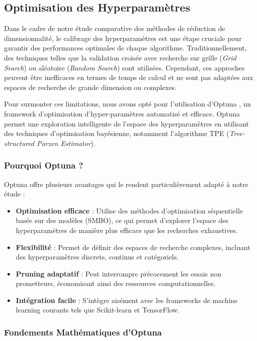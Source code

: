 \documentclass[unnumsec,webpdf,modern,large]{projet_manifold}%
\theoremstyle{thmstyleone}%
\theoremstyle{thmstyletwo}%
\theoremstyle{thmstylethree}%
\begin{document}
\subsection{Optimisation des Hyperparamètres}

Dans le cadre de notre étude comparative des méthodes de réduction de dimensionnalité, le calibrage des hyperparamètres est une étape cruciale pour garantir des performances optimales de chaque algorithme. Traditionnellement, des techniques telles que la validation croisée avec recherche sur grille (\textit{Grid Search}) ou aléatoire (\textit{Random Search}) sont utilisées. Cependant, ces approches peuvent être inefficaces en termes de temps de calcul et ne sont pas adaptées aux espaces de recherche de grande dimension ou complexes.

Pour surmonter ces limitations, nous avons opté pour l'utilisation d'Optuna \cite{akiba2019optuna}, un framework d'optimisation d'hyper-paramètres automatisé et efficace. Optuna permet une exploration intelligente de l'espace des hyperparamètres en utilisant des techniques d'optimisation bayésienne, notamment l'algorithme TPE (\textit{Tree-structured Parzen Estimator}).

\subsubsection{Pourquoi Optuna ?}

Optuna offre plusieurs avantages qui le rendent particulièrement adapté à notre étude :

\begin{itemize} \item \textbf{Optimisation efficace} : Utilise des méthodes d'optimisation séquentielle basée sur des modèles (SMBO), ce qui permet d'explorer l'espace des hyperparamètres de manière plus efficace que les recherches exhaustives. \item \textbf{Flexibilité} : Permet de définir des espaces de recherche complexes, incluant des hyperparamètres discrets, continus et catégoriels. \item \textbf{Pruning adaptatif} : Peut interrompre précocement les essais non prometteurs, économisant ainsi des ressources computationnelles. \item \textbf{Intégration facile} : S'intègre aisément avec les frameworks de machine learning courants tels que Scikit-learn et TensorFlow. \end{itemize}

\subsubsection{Fondements Mathématiques d'Optuna}
\end{document}
